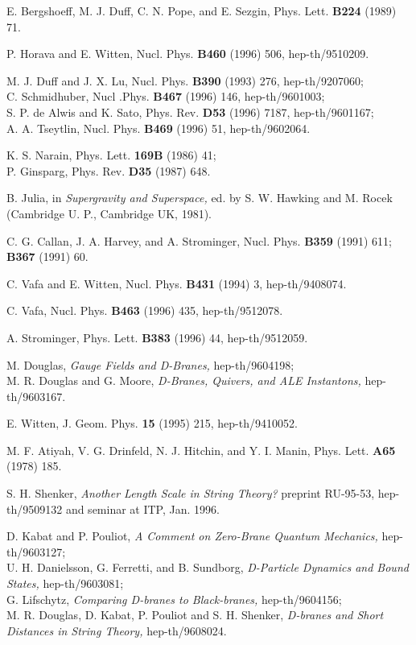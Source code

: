 \begin{thebibliography}{99}
E. Bergshoeff, M. J. Duff, C. N. Pope, and E.
Sezgin, Phys. Lett. {\bf B224} (1989) 71.

P. Horava and E. Witten, Nucl. Phys. {\bf B460} (1996) 506, hep-th/9510209.

M. J. Duff and J. X. Lu, Nucl. Phys. {\bf B390} (1993) 276, hep-th/9207060;\\
C. Schmidhuber, Nucl .Phys. {\bf B467} (1996) 146, hep-th/9601003;\\
S. P. de Alwis and K. Sato, Phys. Rev. {\bf D53} (1996) 7187,
hep-th/9601167;\\
A. A. Tseytlin, Nucl. Phys. {\bf B469} (1996) 51, hep-th/9602064.

K. S. Narain, Phys. Lett. {\bf 169B} (1986) 41;\\
P. Ginsparg, Phys. Rev. {\bf D35} (1987) 648. 

B. Julia, in {\it Supergravity and Superspace,} ed. by S. W. Hawking and M.
Rocek (Cambridge U. P., Cambridge UK, 1981).

C. G. Callan, J. A. Harvey, and A. Strominger, Nucl. Phys. {\bf
B359} (1991) 611; {\bf B367} (1991) 60.

C. Vafa and E. Witten, Nucl. Phys. {\bf B431} (1994) 3,
hep-th/9408074.

C. Vafa, Nucl. Phys. {\bf B463} (1996) 435, hep-th/9512078.

A. Strominger, Phys. Lett. {\bf B383} (1996) 44, hep-th/9512059. 

M. Douglas, {\it Gauge Fields and D-Branes,} hep-th/9604198;\\
M. R. Douglas and G. Moore, {\it D-Branes, Quivers, and
ALE Instantons,} hep-th/9603167.

E. Witten, J. Geom. Phys. {\bf 15} (1995) 215, hep-th/9410052.
 
M. F. Atiyah, V. G. Drinfeld, N. J. Hitchin, and Y. I. Manin, Phys. Lett.
{\bf A65} (1978) 185.

S. H. Shenker, {\it Another Length Scale in String Theory?} preprint RU-95-53,
hep-th/9509132 and seminar at ITP, Jan. 1996.

D. Kabat and P. Pouliot, {\it A Comment on Zero-Brane Quantum
Mechanics,} hep-th/9603127;\\
U. H. Danielsson, G. Ferretti, and B. Sundborg, 
{\it D-Particle Dynamics and Bound States,} hep-th/9603081;\\
G. Lifschytz, {\it Comparing D-branes to Black-branes,}
hep-th/9604156;\\
M. R. Douglas, D. Kabat, P. Pouliot and S. H. Shenker,
{\it D-branes and Short Distances in String Theory,} hep-th/9608024.


\end{thebibliography}
